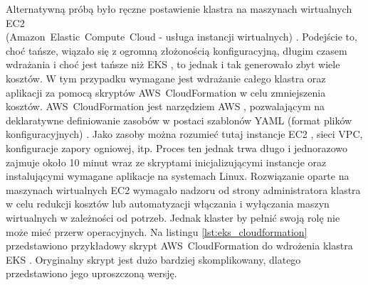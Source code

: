 Alternatywną próbą było ręczne postawienie klastra na maszynach wirtualnych EC2 \\ (\mbox{Amazon Elastic Compute Cloud} - usługa instancji wirtualnych) \cite{ec2_docs}. Podejście to, choć tańsze, wiązało się z ogromną złożonością konfiguracyjną, długim czasem wdrażania i choć jest tańsze niż EKS \cite{eks_docs}, to jednak i tak generowało zbyt wiele kosztów. W tym przypadku wymagane jest wdrażanie całego klastra oraz aplikacji za pomocą skryptów \mbox{AWS CloudFormation} \cite{cloudformation_docs} w celu zmniejszenia kosztów. \mbox{AWS CloudFormation} \cite{cloudformation_docs} jest narzędziem AWS \cite{aws_docs}, pozwalającym na deklaratywne definiowanie zasobów w postaci szablonów YAML (format plików konfiguracyjnych) \cite{yaml_spec}. Jako zasoby można rozumieć tutaj instancje EC2 \cite{ec2_docs}, sieci VPC, konfiguracje zapory ogniowej, itp. Proces ten jednak trwa długo i jednorazowo zajmuje około 10 minut wraz ze skryptami inicjalizującymi instancje oraz instalującymi wymagane aplikacje na systemach Linux. Rozwiązanie oparte na maszynach wirtualnych EC2 \cite{ec2_docs} wymagało nadzoru od strony administratora klastra w celu redukcji kosztów lub automatyzacji włączania i wyłączania maszyn wirtualnych w zależności od potrzeb. Jednak klaster by pełnić swoją rolę nie może mieć przerw operacyjnych. Na listingu \ref{lst:eks_cloudformation} przedstawiono przykładowy skrypt \mbox{AWS CloudFormation} \cite{cloudformation_docs} do wdrożenia klastra EKS \cite{eks_docs}. Oryginalny skrypt jest dużo bardziej skomplikowany, dlatego przedstawiono jego uproszczoną wersję.

